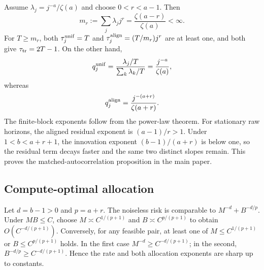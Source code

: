 Assume $\lambda_j=j^{-a}/\zeta(a)$ and choose $0<r<a-1$.  Then
\[
m_r:=\sum_j\lambda_jj^r=\frac{\zeta(a-r)}{\zeta(a)}<\infty.
\]
For $T\ge m_r$, both $\tau_j^{\rm unif}=T$ and
$\tau_j^{\rm align}=(T/m_r)j^r$ are at least one, and both give
$\tau_{\rm tr}=2T-1$.  On the other hand,
\[
q_j^{\rm unif}
=\frac{\lambda_j/T}{\sum_k\lambda_k/T}
=\frac{j^{-a}}{\zeta(a)},
\]
whereas
\[
q_j^{\rm align}
=\frac{j^{-(a+r)}}{\zeta(a+r)}.
\]
The finite-block exponents follow from the power-law theorem.  For stationary
raw horizons, the aligned residual exponent is $(a-1)/r>1$.  Under
$1<b<a+r+1$, the innovation exponent $(b-1)/(a+r)$ is below one, so the
residual term decays faster and the same two distinct slopes remain.  This
proves the matched-autocorrelation proposition in the main paper.

\subsection{Compute-optimal allocation}
Let $d=b-1>0$ and $p=a+r$.  The noiseless risk is comparable to
$M^{-d}+B^{-d/p}$.  Under $MB\le C$, choose
$M\asymp C^{1/(p+1)}$ and $B\asymp C^{p/(p+1)}$ to obtain
$O(C^{-d/(p+1)})$.  Conversely, for any feasible pair, at least one of
$M\le C^{1/(p+1)}$ or $B\le C^{p/(p+1)}$ holds.  In the first case
$M^{-d}\ge C^{-d/(p+1)}$; in the second,
$B^{-d/p}\ge C^{-d/(p+1)}$.  Hence the rate and both allocation exponents are
sharp up to constants.

